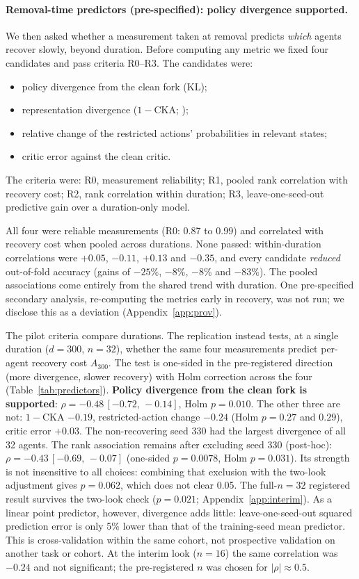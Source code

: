 \documentclass[10pt]{article} %
\newcommand{\ci}[2]{\,[#1,\,#2]}
\begin{document}
\paragraph{Removal-time predictors (pre-specified): policy divergence supported.}
We then asked whether a measurement taken at removal predicts \emph{which} agents recover slowly, beyond duration. Before computing any metric we fixed four candidates and pass criteria R0--R3. The candidates were:
\begin{itemize}
\item policy divergence from the clean fork (KL);
\item representation divergence ($1-$CKA; \citealp{kornblith2019cka});
\item relative change of the restricted actions' probabilities in relevant states;
\item critic error against the clean critic.
\end{itemize}
The criteria were: R0, measurement reliability; R1, pooled rank correlation with recovery cost; R2, rank correlation within duration; R3, leave-one-seed-out predictive gain over a duration-only model.

All four were reliable measurements (R0: 0.87 to 0.99) and correlated with recovery cost when pooled across durations. None passed: within-duration correlations were $+0.05$, $-0.11$, $+0.13$ and $-0.35$, and every candidate \emph{reduced} out-of-fold accuracy (gains of $-25\%$, $-8\%$, $-8\%$ and $-83\%$). The pooled associations come entirely from the shared trend with duration. One pre-specified secondary analysis, re-computing the metrics early in recovery, was not run; we disclose this as a deviation (Appendix~\ref{app:prov}).

The pilot criteria compare durations. The replication instead tests, at a single duration ($d=300$, $n=32$), whether the same four measurements predict per-agent recovery cost $A_{300}$. The test is one-sided in the pre-registered direction (more divergence, slower recovery) with Holm correction across the four (Table~\ref{tab:predictors}). \textbf{Policy divergence from the clean fork is supported}: $\rho=-0.48\ci{-0.72}{-0.14}$, Holm $p=0.010$. The other three are not: $1-$CKA $-0.19$, restricted-action change $-0.24$ (Holm $p=0.27$ and $0.29$), critic error $+0.03$. The non-recovering seed 330 had the largest divergence of all 32 agents. The rank association remains after excluding seed 330 (post-hoc): $\rho=-0.43\ci{-0.69}{-0.07}$ (one-sided $p=0.0078$, Holm $p=0.031$). Its strength is not insensitive to all choices: combining that exclusion with the two-look adjustment gives $p=0.062$, which does not clear 0.05. The full-$n=32$ registered result survives the two-look check ($p=0.021$; Appendix~\ref{app:interim}). As a linear point predictor, however, divergence adds little: leave-one-seed-out squared prediction error is only 5\% lower than that of the training-seed mean predictor. This is cross-validation within the same cohort, not prospective validation on another task or cohort. At the interim look ($n=16$) the same correlation was $-0.24$ and not significant; the pre-registered $n$ was chosen for $|\rho|\approx0.5$.
\end{document}
